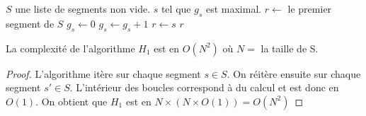 \begin{algorithm}
  \caption{$H_1$($S$)}
  \begin{algorithmic}[1] \label{algo:h1}
    \REQUIRE $S$ une liste de segments non vide.
    \ENSURE $s$ tel que $g_s$ est maximal.
    \STATE$r\leftarrow$ le premier segment de $S$
    \STATE $g_s\leftarrow 0$
    \ENDFOR
    \STATE $g_s\leftarrow g_s +1$
    \ENDIF
    \ENDFOR
    \STATE $r\leftarrow s$
    \ENDIF
    \ENDFOR
    \RETURN $r$
  \end{algorithmic}
\end{algorithm}

\begin{prop}
  La complexité de l'algorithme $H_1$ est en $O(N^2)$ où $N =$ la taille de S.
\end{prop}
\begin{proof}
  L'algorithme itère sur chaque segment $s \in S$.
  On réitère ensuite sur chaque segment $s' \in S$.
  L'intérieur des boucles correspond à du calcul et
  est donc en $O(1)$. On obtient que $H_1$ est en $N\times(N\times{}O(1)) = O(N^2)$
\end{proof}



